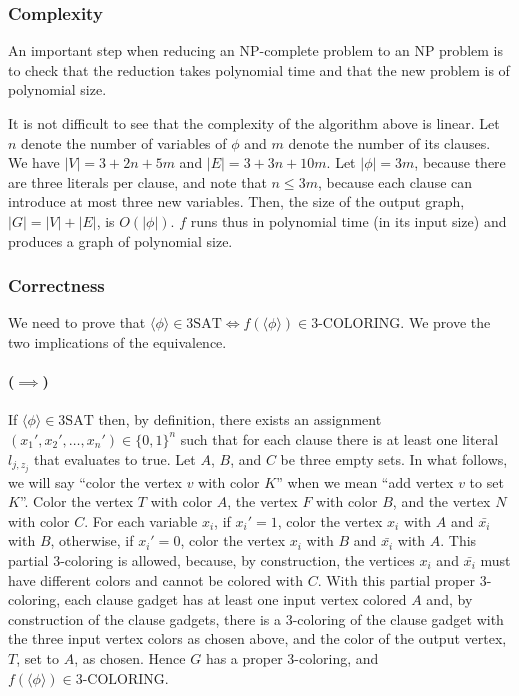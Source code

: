 \documentclass{article}
\newcommand{\card}[1]{|#1|}
\begin{document}
\subsubsection{Complexity}
An important step when reducing an NP-complete problem to an NP problem is to
check that the reduction takes polynomial time and that the new problem is of
polynomial size.

It is not difficult to see that the complexity of the algorithm above is
linear. Let $n$ denote the number of variables of $\phi$ and $m$ denote the
number of its clauses. We have $\card{V} = 3 + 2n + 5m$ and $\card{E} = 3 +
3n + 10m$. Let $\card{\phi} = 3m$, because there are three literals per clause,
and note that $n \le 3m$, because each clause can introduce at most three new
variables. Then, the size of the output graph, $\card{G} = \card{V} + \card{E}$,
is $O(\card{\phi})$. $f$ runs thus in polynomial time (in its input size)
and produces a graph of polynomial size.

\subsubsection{Correctness}

We need to prove that $\langle \phi \rangle \in \text{3SAT} \iff f(\langle \phi \rangle) \in
\text{3-COLORING}$. We prove the two implications of the equivalence.

\paragraph{($\implies$)} If $\langle\phi\rangle \in \text{3SAT}$ then, by definition,
there exists an assignment $(x_1', x_2', \ldots, x_n') \in \{0,1\}^n$ such
that for each clause there is at least one literal $l_{j,z_j}$ that evaluates
to true.
Let $A$, $B$, and $C$ be three empty sets. In what follows, we will say ``color the
vertex $v$ with color $K$'' when we mean ``add vertex $v$ to set $K$''.
%
Color the vertex $T$ with color $A$,
the vertex $F$ with color $B$, and
the vertex $N$ with color $C$.
For each variable $x_i$, if $x_i'=1$, color the vertex $x_i$ with $A$ and
$\bar{x_i}$ with $B$, otherwise, if $x_i'=0$, color the vertex
$x_i$ with $B$ and $\bar{x_i}$ with $A$. This partial 3-coloring is allowed,
because, by construction, the vertices $x_i$ and $\bar{x_i}$ must
have different colors and cannot be colored with $C$. With this partial proper
3-coloring, each clause gadget has at least
one input vertex colored $A$ and, by construction of the clause gadgets,
there is a 3-coloring of the clause gadget with the three input vertex colors
as chosen above, and the color of the output vertex, $T$, set to $A$, as
chosen. Hence $G$ has a proper 3-coloring,
and $f(\langle \phi \rangle) \in \text{3-COLORING}$.
\end{document}
